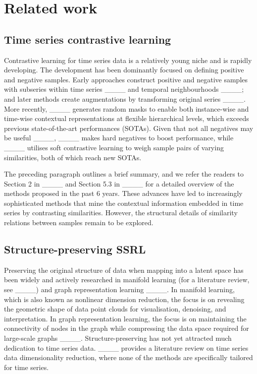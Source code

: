 \section{Related work}
\label{sec: related work}
\subsection{Time series contrastive learning}
Contrastive learning for time series data is a relatively young niche and is rapidly developing. The development has been dominantly focused on defining positive and negative samples. Early approaches construct positive and negative samples with subseries within time series ____ and temporal neighbourhoods ____; and later methods create augmentations by transforming original series ____. More recently, ____ generates random masks to enable both instance-wise and time-wise contextual representations at flexible hierarchical levels, which exceeds previous state-of-the-art performances (SOTAs). Given that not all negatives may be useful ____, ____ makes hard negatives to boost performance, while ____ utilises soft contrastive learning to weigh sample pairs of varying similarities, both of which reach new SOTAs. 

The preceding paragraph outlines a brief summary, and we refer the readers to Section 2 in ____ and Section 5.3 in ____ for a detailed overview of the methods proposed in the past 6 years. These advances have led to increasingly sophisticated methods that mine the contextual information embedded in time series by contrasting similarities. However, the structural details of similarity relations between samples remain to be explored. 

\subsection{Structure-preserving SSRL}
Preserving the original structure of data when mapping into a latent space has been widely and actively researched in manifold learning (for a literature review, see ____) and graph representation learning ____. In manifold learning, which is also known as nonlinear dimension reduction, the focus is on revealing the geometric shape of data point clouds for visualisation, denoising, and interpretation. In graph representation learning, the focus is on maintaining the connectivity of nodes in the graph while compressing the data space required for large-scale graphs ____. Structure-preserving has not yet attracted much dedication to time series data. ____ provides a literature review on time series data dimensionality reduction, where none of the methods are specifically tailored for time series.

